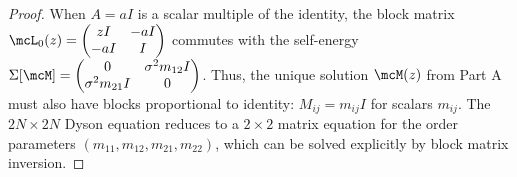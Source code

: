 \begin{proof}
When $A = aI$ is a scalar multiple of the identity, the block matrix $\mcL_0(z) = \begin{pmatrix} zI & -aI \\ -aI & I \end{pmatrix}$ commutes with the self-energy $\Sigma[\mcM] = \begin{pmatrix} 0 & \sigma^2 m_{12} I \\ \sigma^2 m_{21} I & 0 \end{pmatrix}$. Thus, the unique solution $\mcM(z)$ from Part A must also have blocks proportional to identity: $M_{ij} = m_{ij} I$ for scalars $m_{ij}$. The $2N \times 2N$ Dyson equation reduces to a $2 \times 2$ matrix equation for the order parameters $(m_{11}, m_{12}, m_{21}, m_{22})$, which can be solved explicitly by block matrix inversion.
\end{proof}
